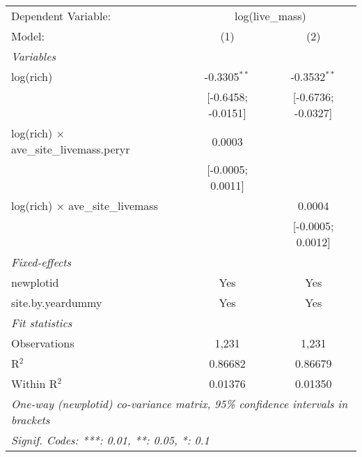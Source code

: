 \begin{tabular}{lcc}
\tabularnewline\midrule\midrule
Dependent Variable:&\multicolumn{2}{c}{log(live\_mass)}\\
Model:&(1) & (2)\\
\midrule \emph{Variables}&   &  \\
log(rich)&-0.3305$^{**}$ & -0.3532$^{**}$\\
  &[-0.6458; -0.0151] & [-0.6736; -0.0327]\\
log(rich) $\times $ ave\_site\_livemass.peryr&0.0003 &   \\
  &[-0.0005; 0.0011] &   \\
log(rich) $\times $ ave\_site\_livemass&   & 0.0004\\
  &   & [-0.0005; 0.0012]\\
\midrule \emph{Fixed-effects}&   &  \\
newplotid & Yes & Yes\\
site.by.yeardummy & Yes & Yes\\
\midrule \emph{Fit statistics}&  & \\
Observations & 1,231&1,231\\
R$^2$ & 0.86682&0.86679\\
Within R$^2$ & 0.01376&0.01350\\
\midrule\midrule\multicolumn{3}{l}{\emph{One-way (newplotid) co-variance matrix, 95\% confidence intervals in brackets}}\\
\multicolumn{3}{l}{\emph{Signif. Codes: ***: 0.01, **: 0.05, *: 0.1}}\\
\end{tabular}


